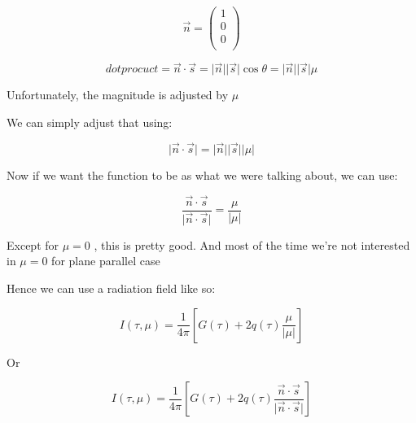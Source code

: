 \documentclass[12pt]{article}
\renewcommand{\_}{\kern-1.5pt\textunderscore\kern-1.5pt}
\begin{document}
\begin{itemize}
 \[ \overrightarrow{n}= \left( \begin{array}{c}
	1\\
	0\\
	0\\
	\end{array} \right)  \] \par


\vspace{\baselineskip}
 \[ dot procuct=\overrightarrow{n} \cdot \overrightarrow{s}= \vert \overrightarrow{n} \vert  \vert \overrightarrow{s} \vert \cos  \theta = \vert \overrightarrow{n} \vert  \vert \overrightarrow{s} \vert  \mu  \] \par

Unfortunately, the magnitude is adjusted by  \(  \mu  \) \par

We can simply adjust that using:\par

 \[  \vert \overrightarrow{n} \cdot \overrightarrow{s} \vert = \vert \overrightarrow{n} \vert  \vert \overrightarrow{s} \vert  \vert  \mu  \vert  \] \par

Now if we want the function to be as what we were talking about, we can use:\par

 \[ \frac{\overrightarrow{n} \cdot \overrightarrow{s}}{ \vert \overrightarrow{n} \cdot \overrightarrow{s} \vert }=\frac{ \mu }{ \vert  \mu  \vert } \] \par

Except for  \(  \mu =0 \) , this is pretty good. And most of the time we’re not interested in  \(  \mu =0 \)  for plane parallel case\par

Hence we can use a radiation field like so:\par

 \[ I \left(  \tau, \mu  \right) =\frac{1}{4 \pi } \left[ G \left(  \tau \right) +2q \left(  \tau \right) \frac{ \mu }{ \vert  \mu  \vert } \right]  \] \par

Or \par

 \[ I \left(  \tau, \mu  \right) =\frac{1}{4 \pi } \left[ G \left(  \tau \right) +2q \left(  \tau \right) \frac{\overrightarrow{n} \cdot \overrightarrow{s}}{ \vert \overrightarrow{n} \cdot \overrightarrow{s} \vert } \right]  \] \par


\end{itemize}
\end{document}
